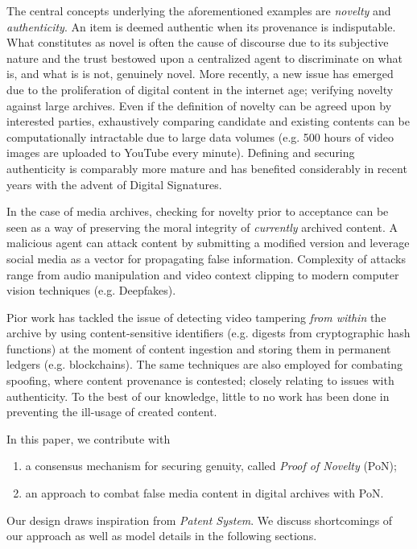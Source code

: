 \documentclass[conference]{IEEEtran}
\begin{document}
The central concepts underlying the aforementioned examples are \emph{novelty} and \emph{authenticity}. An item is deemed authentic when its provenance is indisputable. What constitutes as novel is often the cause of discourse due to its subjective nature and the trust bestowed upon a centralized agent to discriminate on what is, and what is is not, genuinely novel. More recently, a new issue has emerged due to the proliferation of digital content in the internet age; verifying novelty against large archives. Even if the definition of novelty can be agreed upon by interested parties, exhaustively comparing candidate and existing contents can be computationally intractable due to large data volumes (e.g. 500 hours of video images are uploaded to YouTube every minute). Defining and securing authenticity is comparably more mature and has benefited considerably in recent years with the advent of Digital Signatures.

In the case of media archives, checking for novelty prior to acceptance can be seen as a way of preserving the moral integrity of \emph{currently} archived content. A malicious agent can attack content by submitting a modified version and leverage social media as a vector for propagating false information. Complexity of attacks range from audio manipulation and video context clipping to modern computer vision techniques (e.g. Deepfakes). 

Pior work has tackled the issue of detecting video tampering \emph{from within} the archive by using content-sensitive identifiers (e.g. digests from cryptographic hash functions) at the moment of content ingestion and storing them in permanent ledgers (e.g. blockchains). The same techniques are also employed for combating spoofing, where content provenance is contested; closely relating to issues with authenticity. To the best of our knowledge, little to no work has been done in preventing the ill-usage of created content.

In this paper, we contribute with

\begin{enumerate}
    \item a consensus mechanism for securing genuity, called \emph{Proof of Novelty} (PoN);
    \item an approach to combat false media content in digital archives with PoN.
\end{enumerate}

Our design draws inspiration from \emph{Patent System}. We discuss shortcomings of our approach as well as model details in the following sections.
\end{document}
